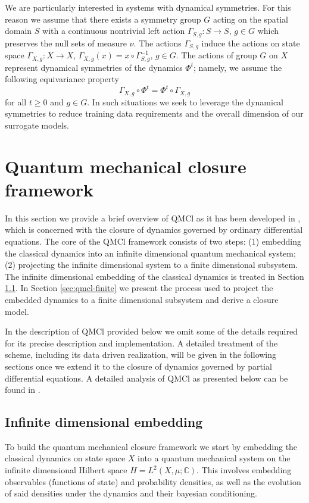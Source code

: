 \documentclass[letterpaper,10pt,3p,preprint]{elsarticle}
\newcommand{\Cbb}{\mathbb{C}}
\begin{document}
We are particularly interested in systems with dynamical symmetries.
For this reason we assume that there exists a symmetry group $G$
acting on the spatial domain $S$ with a continuous nontrivial
left action
$\Gamma_{S,g}\colon S\rightarrow S$, $g\in G$
which preserves the null sets of measure $\nu$.
The actions $\Gamma_{S,g}$ induce the actions on state space
$\Gamma_{X,g}\colon X\rightarrow X$,
$\Gamma_{X,g}(x)=x\circ\Gamma_{S,g}^{-1}$, $g\in G$.
The actions of group $G$ on $X$ represent dynamical symmetries
of the dynamics $\Phi^t$; namely, we assume the following
equivariance property
\begin{equation*}
    \Gamma_{X,g}\circ\Phi^t=\Phi^t\circ\Gamma_{X,g}
\end{equation*}
for all $t\geq 0$ and $g\in G$.
In such situations we seek to leverage the dynamical symmetries
to reduce training data requirements and the overall dimension
of our surrogate models.

\section{Quantum mechanical closure framework}\label{sec:qmcl}
In this section we provide a brief overview of QMCl as it has
been developed in
\cite{Giannakis2019pre,Freeman2023,Freeman2024},
which is concerned with the closure of dynamics governed
by ordinary differential equations.
The core of the QMCl framework consists of two steps:
(1) embedding the classical dynamics into an infinite dimensional
quantum mechanical system;
(2) projecting the infinite dimensional system to a finite
dimensional subsystem.
The infinite dimensional embedding of the classical dynamics is
treated in Section \ref{sec:qmcl-infinite}.
In Section \ref{sec:qmcl-finite} we present the process used
to project the embedded dynamics to a finite dimensional
subsystem and derive a closure model.

In the description of QMCl provided below we
omit some of the details required for its precise description
and implementation.
A detailed treatment of the scheme, including its data driven realization,
will be given in the following sections once we extend it to the
closure of dynamics governed by partial differential equations.
A detailed analysis of QMCl as presented below can be found in
\cite{Giannakis2019pre,Freeman2023,Freeman2024}.

\subsection{Infinite dimensional embedding}\label{sec:qmcl-infinite}
To build the quantum mechanical closure framework we start by embedding
the classical dynamics on state space $X$ into a quantum mechanical
system on the infinite dimensional Hilbert space
$H=L^2(X,\mu;\Cbb)$.
This involves embedding observables (functions of state) and
probability densities, as well as the evolution of said densities under
the dynamics and their bayesian conditioning.
\end{document}
